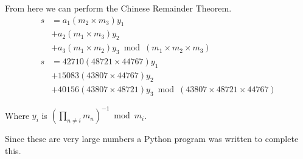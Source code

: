 \documentclass{article}
\begin{document}
From here we can perform the Chinese Remainder Theorem.
\begin{align*}
    s &= a_1 (m_2 \times m_3) y_1 \\
      &+ a_2 (m_1 \times m_3) y_2 \\
      &+ a_3 (m_1 \times m_2) y_3 \bmod (m_1 \times m_2 \times m_3) \\
    s &= 42710 (48721 \times 44767) y_1 \\
      &+ 15083 (43807 \times 44767) y_2 \\
      &+ 40156 (43807 \times 48721) y_3 \bmod (43807 \times 48721 \times 44767)
\end{align*}

Where $y_i$ is $(\prod_{n \neq i} m_n)^{-1} \bmod m_i$.

Since these are very large numbers a Python program was written to complete
this.

\end{document}
